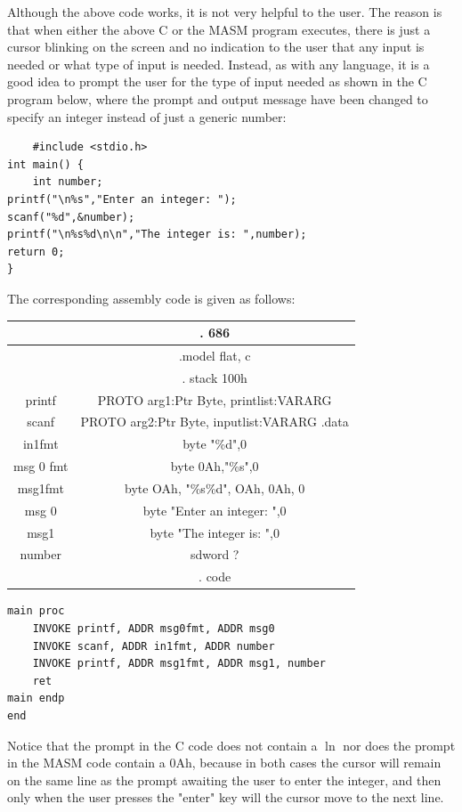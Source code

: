 \documentclass[10pt]{book}
\begin{document}
Although the above code works, it is not very helpful to the user. The reason is that when either the above C or the MASM program executes, there is just a cursor blinking on the screen and no indication to the user that any input is needed or what type of input is needed. Instead, as with any language, it is a good idea to prompt the user for the type of input needed as shown in the C program below, where the prompt and output message have been changed to specify an integer instead of just a generic number:

\begin{verbatim}
    #include <stdio.h>
int main() {
    int number;
printf("\n%s","Enter an integer: ");
scanf("%d",&number);
printf("\n%s%d\n\n","The integer is: ",number);
return 0;
}
\end{verbatim}

The corresponding assembly code is given as follows:

\begin{center}
\begin{tabular}{|c|c|}
\hline
 & . 686 \\
\hline
 & .model flat, c \\
\hline
 & . stack 100h \\
\hline
printf & PROTO arg1:Ptr Byte, printlist:VARARG \\
\hline
scanf & PROTO arg2:Ptr Byte, inputlist:VARARG .data \\
\hline
in1fmt & byte "\%d",0 \\
\hline
msg 0 fmt & byte 0Ah,"\%s",0 \\
\hline
msg1fmt & byte OAh, "\%s\%d", OAh, 0Ah, 0 \\
\hline
msg 0 & byte "Enter an integer: ",0 \\
\hline
msg1 & byte "The integer is: ",0 \\
\hline
number & sdword ? \\
\hline
 & . code \\
\hline
\end{tabular}
\end{center}

\begin{verbatim}
main proc
    INVOKE printf, ADDR msg0fmt, ADDR msg0
    INVOKE scanf, ADDR in1fmt, ADDR number
    INVOKE printf, ADDR msg1fmt, ADDR msg1, number
    ret
main endp
end
\end{verbatim}

Notice that the prompt in the C code does not contain a $\ln$ nor does the prompt in the MASM code contain a 0Ah, because in both cases the cursor will remain on the same line as the prompt awaiting the user to enter the integer, and then only when the user presses the "enter" key will the cursor move to the next line.
\end{document}
